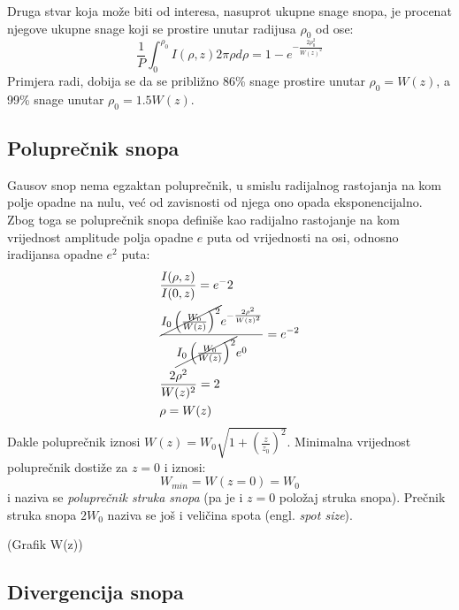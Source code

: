 \documentclass[fleqn]{report}
\begin{document}
Druga stvar koja može biti od interesa, nasuprot ukupne snage snopa, je procenat njegove ukupne snage koji se prostire unutar radijusa $\rho_0$ od ose:
\begin{equation}
    \frac{1}{P} \int_0^{\rho_0} I(\rho, z) 2\pi\rho d\rho = 1 - e^{-\frac{2\rho_0^2}{W(z)^2}} \label{gs - procenat snage}
\end{equation}
Primjera radi, dobija se da se približno 86\% snage prostire unutar $\rho_0 = W(z)$, a 99\% snage unutar $\rho_0 = 1.5W(z)$.

\subsection{Poluprečnik snopa}
Gausov snop nema egzaktan poluprečnik, u smislu radijalnog rastojanja na kom polje opadne na nulu, već od zavisnosti od njega ono opada eksponencijalno.
Zbog toga se poluprečnik snopa definiše kao radijalno rastojanje na kom vrijednost amplitude polja opadne $e$ puta od vrijednosti na osi, odnosno iradijansa opadne $e^2$ puta:
\begin{align*}
     & \frac{I(\rho, z)}{I(0, z)} = e^-2                                                                                                          \\
     & \frac{\cancel{I_0 \left(\frac{W_0}{W(z)}\right)^2} e^{-\frac{2\rho^2}{W(z)^2}}}{\cancel{I_0 \left(\frac{W_0}{W(z)}\right)^2} e^0} = e^{-2} \\
     & \frac{2\rho^2}{W(z)^2} = 2                                                                                                                 \\
     & \rho = W(z)
\end{align*}
Dakle poluprečnik iznosi $W(z) = W_0\sqrt{1 + \left(\frac{z}{z_0}\right)^2}$.
Minimalna vrijednost poluprečnik dostiže za $z = 0$ i iznosi:
\begin{equation*}
    W_{min} = W(z = 0) = W_0
\end{equation*}
i naziva se \emph{poluprečnik struka snopa} (pa je i $z = 0$ položaj struka snopa).
Prečnik struka snopa $2W_0$ naziva se još i veličina spota (engl. \emph{spot size}).

(Grafik W(z))

\subsection{Divergencija snopa}
\end{document}
